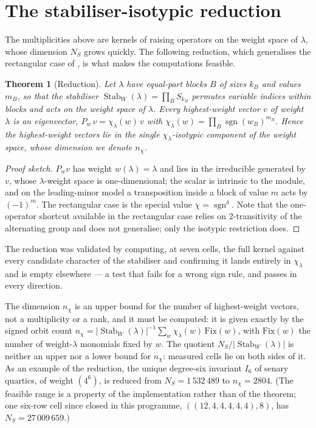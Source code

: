 \documentclass[11pt]{amsart}
\theoremstyle{plain}
\newtheorem{theorem}{Theorem}[section]
\theoremstyle{definition}
\theoremstyle{remark}
\DeclareMathOperator{\Stab}{Stab}
\begin{document}
\section{The stabiliser-isotypic reduction}\label{sec:reduction}

The multiplicities above are kernels of raising operators on the weight space
of $\lambda$, whose dimension $N_S$ grows quickly.  The following reduction,
which generalises the rectangular case of \cite{Companion}, is what makes the
computations feasible.

\begin{theorem}[Reduction]\label{thm:reduction}
Let $\lambda$ have equal-part blocks $B$ of sizes $k_B$ and values $m_B$, so
that the stabiliser $\Stab_W(\lambda)=\prod_B S_{k_B}$ permutes variable indices
within blocks and acts on the weight space of $\lambda$.  Every highest-weight
vector $v$ of weight $\lambda$ is an eigenvector,
$P_w\,v=\chi_\lambda(w)\,v$ with $\chi_\lambda(w)=\prod_B\operatorname{sgn}(w_B)^{m_B}$.
Hence the highest-weight vectors lie in the single $\chi_\lambda$-isotypic
component of the weight space, whose dimension we denote $n_\chi$.
\end{theorem}

\begin{proof}[Proof sketch]
$P_w v$ has weight $w(\lambda)=\lambda$ and lies in the irreducible generated
by $v$, whose $\lambda$-weight space is one-dimensional; the scalar is
intrinsic to the module, and on the leading-minor model a transposition inside
a block of value $m$ acts by $(-1)^{m}$.  The rectangular case is the special
value $\chi=\operatorname{sgn}^{\delta}$.  Note that the one-operator shortcut
available in the rectangular case relies on $2$-transitivity of the alternating
group and does not generalise; only the isotypic restriction does.
\end{proof}

The reduction was validated by computing, at seven cells, the full kernel
against every candidate character of the stabiliser and confirming it lands
entirely in $\chi_\lambda$ and is empty elsewhere --- a test that fails for a
wrong sign rule, and passes in every direction.

The dimension $n_\chi$ is an upper bound for the number of highest-weight
vectors, not a multiplicity or a rank, and it must be computed: it is given
exactly by the signed orbit count
$n_\chi=|\Stab_W(\lambda)|^{-1}\sum_{w}\chi_\lambda(w)\,\mathrm{Fix}(w)$, with
$\mathrm{Fix}(w)$ the number of weight-$\lambda$ monomials fixed by $w$.  The
quotient $N_S/|\Stab_W(\lambda)|$ is neither an upper nor a lower bound for
$n_\chi$: measured cells lie on both sides of it.  As an example of the
reduction, the unique degree-six invariant $I_6$ of senary quartics, of weight
$(4^{6})$, is reduced from $N_S=1\,532\,489$ to $n_\chi=2804$.  (The feasible
range is a property of the implementation rather than of the theorem; one
six-row cell since closed in this programme, $((12,4,4,4,4,4),8)$, has
$N_S=27\,009\,659$.)
\end{document}
